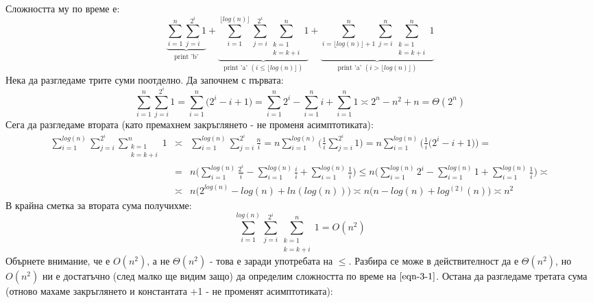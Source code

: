 \begin{solution}
	Сложността му по време е:
	\begin{equation}\label{eqn-3-1}
		\underbrace{\sum\limits_{i=1}^{n}\sum\limits_{j=i}^{2^i}1}_{\text{print 'b'}}+\underbrace{\sum\limits_{i=1}^{\lfloor log(n)\rfloor}\sum\limits_{j=i}^{2^i}\sum\limits_{\substack{k=1\\k=k+i}}^n1}_{\text{print 'a' }(i\le\lfloor log(n)\rfloor)}+\underbrace{\sum\limits_{i=\lfloor log(n)\rfloor+1}^n\sum\limits_{j=i}^n\sum\limits_{\substack{k=1\\k=k+i}}^n1}_{\text{print 'a' }(i>\lfloor log(n)\rfloor)}
	\end{equation}
	Нека да разгледаме трите суми поотделно. Да започнем с първата:
	\begin{equation*}
		\sum\limits_{i=1}^n\sum\limits_{j=i}^{2^i}1=\sum\limits_{i=1}^n\Big(2^i-i+1\Big)=\sum\limits_{i=1}^n2^i-\sum\limits_{i=1}^ni+\sum\limits_{i=1}^n1\asymp2^n-n^2+n=\Theta(2^n)
	\end{equation*}
	Сега да разгледаме втората (като премахнем закръглянето - не променя асимптотиката):
	\begin{eqnarray*}
		\sum\limits_{i=1}^{log(n)}\sum\limits_{j=i}^{2^i}\sum\limits_{\substack{k=1\\k=k+i}}^n1 &\asymp& 
		\sum\limits_{i=1}^{log(n)}\sum\limits_{j=i}^{2^i}\frac ni =
		n\sum\limits_{i=1}^{log(n)}\bigg(\frac1i\sum\limits_{j=i}^{2^i}1\bigg) =
		n\sum\limits_{i=1}^{log(n)}\bigg(\frac1i\Big(2^i-i+1\Big)\bigg) =\\
		&=&
		n\Bigg(\sum\limits_{i=1}^{log(n)}\frac{2^i}i-\sum\limits_{i=1}^{log(n)}\frac ii+\sum\limits_{i=1}^{log(n)}\frac1i\Bigg) \le
		n\Bigg(\sum\limits_{i=1}^{log(n)}2^i-\sum\limits_{i=1}^{log(n)}1+\sum\limits_{i=1}^{log(n)}\frac1i\Bigg) \asymp \\
		&\asymp&
		n\Big(2^{log(n)}-log(n)+ln(log(n))\Big) \asymp n\Big(n-log(n)+log^{(2)}(n)\Big) \asymp n^2
	\end{eqnarray*}
	В крайна сметка за втората сума получихме:
	\begin{equation*}
		\sum\limits_{i=1}^{log(n)}\sum\limits_{j=i}^{2^i}\sum\limits_{\substack{k=1\\k=k+i}}^n1=O(n^2)
	\end{equation*}
	Обърнете внимание, че е $O(n^2)$, а не $\Theta(n^2)$ - това е заради употребата на $\le$. Разбира се може в действителност да е $\Theta(n^2)$, но $O(n^2)$ ни е достатъчно (след малко ще видим защо) да определим сложността по време на $\ref{eqn-3-1}$. Остана да разгледаме третата сума (отново махаме закръглянето и константата +1 - не променят асимптотиката):

\end{solution}
